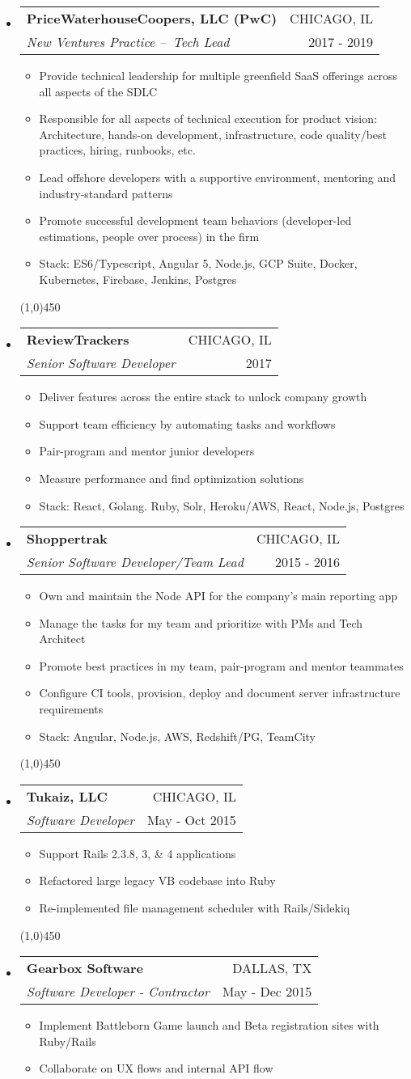 \documentclass[letterpaper,11pt]{article}
\makeatletter
\newcommand{\resitem}[1]{\item #1 \vspace{-3pt}}
\newcommand{\thinline}{\line(1,0){450}}
\newcommand{\ressubheading}[4]{
	\begin{tabular*}{6.5in}{l@{\extracolsep{\fill}}r}
    \textbf{#1} & \MakeUppercase{#2} \\
			\textit{#3} & #4 \\
	\end{tabular*}\vspace{-6pt}}
\makeatother
\begin{document}
\begin{itemize}
\item
  \ressubheading{PriceWaterhouseCoopers, LLC (PwC)}{Chicago, IL}{New Ventures Practice – Tech Lead}{2017 - 2019}
	\begin{itemize}
    \resitem{Provide technical leadership for multiple greenfield SaaS offerings across all aspects of the SDLC}
		\resitem{Responsible for all aspects of technical execution for product vision: Architecture, hands-on development, infrastructure, code quality/best practices, hiring, runbooks, etc.}
		\resitem{Lead offshore developers with a supportive environment, mentoring and industry-standard patterns}
		\resitem{Promote successful development team behaviors (developer-led estimations, people over process) in the firm}
		\resitem{Stack: ES6/Typescript, Angular 5, Node.js, GCP Suite, Docker, Kubernetes, Firebase, Jenkins, Postgres}
	\end{itemize}
  \thinline
    

\item
  \ressubheading{ReviewTrackers}{Chicago, IL}{Senior Software Developer}{2017}
	\begin{itemize}
    \resitem{Deliver features across the entire stack to unlock company growth}
    \resitem{Support team efficiency by automating tasks and workflows}
    \resitem{Pair-program and mentor junior developers}
    \resitem{Measure performance and find optimization solutions}
        \resitem{Stack: React, Golang. Ruby, Solr, Heroku/AWS, React, Node.js, Postgres}
	\end{itemize}

\item
  \ressubheading{Shoppertrak}{Chicago, IL}{Senior Software Developer/Team Lead}{2015 - 2016}
	\begin{itemize}
    \resitem{Own and maintain the Node API for the company's main reporting app }
    \resitem{Manage the tasks for my team and prioritize with PMs and Tech Architect}
    \resitem{Promote best practices in my team, pair-program and mentor teammates}
    \resitem{Configure CI tools, provision, deploy and document server infrastructure requirements}
     \resitem{Stack: Angular, Node.js, AWS, Redshift/PG, TeamCity}
	\end{itemize}
  \thinline
    


\item
	\ressubheading{Tukaiz, LLC}{Chicago, IL}{Software Developer}{May - Oct 2015}
	\begin{itemize}
		\resitem{Support Rails 2.3.8, 3, \& 4 applications }
		\resitem{Refactored large legacy VB codebase into Ruby}
		\resitem{Re-implemented file management scheduler with Rails/Sidekiq}
	\end{itemize}
  \thinline
    

\item 
	\ressubheading{Gearbox Software}{Dallas, TX}{Software Developer - Contractor}{May - Dec 2015}
	\begin{itemize}
		\resitem{Implement Battleborn Game launch and Beta registration sites with Ruby/Rails}
		\resitem{Collaborate on UX flows and internal API flow}
	\end{itemize}

\end{itemize}
\end{document}
